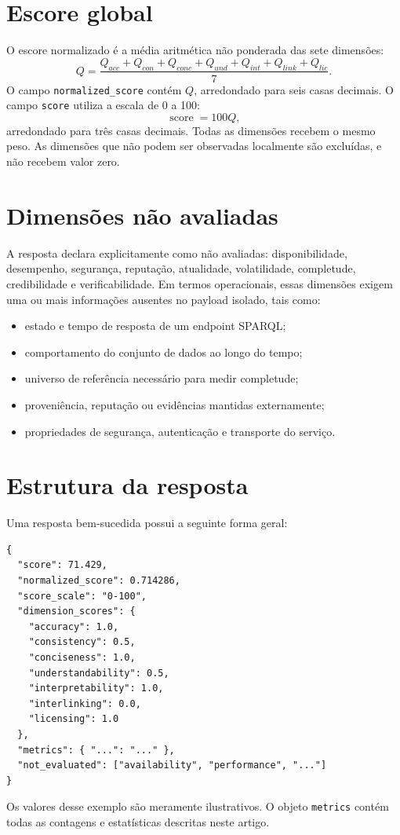 \documentclass[12pt,a4paper]{article}
\newcommand{\metrica}[1]{\texttt{#1}}
\begin{document}
\section{Escore global}
O escore normalizado é a média aritmética não ponderada das sete dimensões:
\[
Q=\frac{Q_{acc}+Q_{con}+Q_{conc}+Q_{und}+Q_{int}+Q_{link}+Q_{lic}}{7}.
\]
O campo \metrica{normalized\_score} contém \(Q\), arredondado para seis casas decimais. O campo \metrica{score} utiliza a escala de 0 a 100:
\[
\operatorname{score}=100Q,
\]
arredondado para três casas decimais. Todas as dimensões recebem o mesmo peso. As dimensões que não podem ser observadas localmente são excluídas, e não recebem valor zero.
\section{Dimensões não avaliadas}
A resposta declara explicitamente como não avaliadas: disponibilidade, desempenho, segurança, reputação, atualidade, volatilidade, completude, credibilidade e verificabilidade. Em termos operacionais, essas dimensões exigem uma ou mais informações ausentes no payload isolado, tais como:
\begin{itemize}
  \item estado e tempo de resposta de um endpoint SPARQL;
  \item comportamento do conjunto de dados ao longo do tempo;
  \item universo de referência necessário para medir completude;
  \item proveniência, reputação ou evidências mantidas externamente;
  \item propriedades de segurança, autenticação e transporte do serviço.
\end{itemize}
\section{Estrutura da resposta}
Uma resposta bem-sucedida possui a seguinte forma geral:
\begin{lstlisting}[style=codigo]
{
  "score": 71.429,
  "normalized_score": 0.714286,
  "score_scale": "0-100",
  "dimension_scores": {
    "accuracy": 1.0,
    "consistency": 0.5,
    "conciseness": 1.0,
    "understandability": 0.5,
    "interpretability": 1.0,
    "interlinking": 0.0,
    "licensing": 1.0
  },
  "metrics": { "...": "..." },
  "not_evaluated": ["availability", "performance", "..."]
}
\end{lstlisting}
Os valores desse exemplo são meramente ilustrativos. O objeto \metrica{metrics} contém todas as contagens e estatísticas descritas neste artigo.
\end{document}
